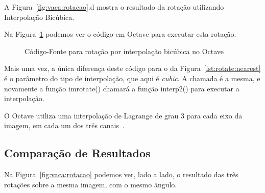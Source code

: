 \documentclass[12pt]{article}
\begin{document}
A Figura~\ref{fig:vaca:rotacao}.d mostra o resultado da rotação utilizando Interpolação Bicúbica.

Na Figura~\ref{lst:rotate:bicubic} podemos ver o código em Octave para executar esta rotação.

\begin{figure}[H]

\caption{Código-Fonte para rotação por interpolação bicúbica no Octave}
\label{lst:rotate:bicubic}
\end{figure}

Mais uma vez, a única diferença deste código para o da Figura~\ref{lst:rotate:nearest} é o parâmetro do tipo de interpolação, que aqui é \emph{cubic}. A chamada é a mesma, e novamente a função \textsf{imrotate()} chamará a função \textsf{interp2()} para executar a interpolação.

O Octave utiliza uma interpolação de Lagrange de grau 3 para cada eixo da imagem, em cada um dos três canais~\cite{eaton:2008}.

\subsection{Comparação de Resultados}\label{sec:rotacao:comparacao}

Na Figura~\ref{fig:vaca:rotacao} podemos ver, lado a lado, o resultado das três rotações sobre a mesma imagem, com o mesmo ângulo.
\end{document}
